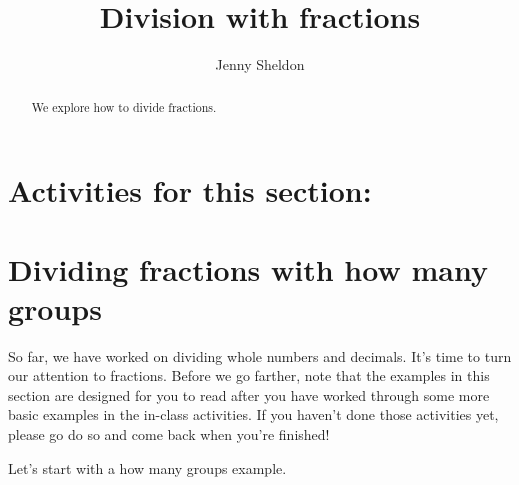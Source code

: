 \documentclass{ximera}
\title{Division with fractions}
\author{Jenny Sheldon}
\begin{document}
\begin{abstract}
We explore how to divide fractions.
\end{abstract}
\maketitle

\section{Activities for this section:} 

\section{Dividing fractions with how many groups}

So far, we have worked on dividing whole numbers and decimals. It's time to turn our attention to fractions. Before we go farther, note that the examples in this section are designed for you to read after you have worked through some more basic examples in the in-class activities. If you haven't done those activities yet, please go do so and come back when you're finished! 

Let's start with a how many groups example. 
\end{document}
